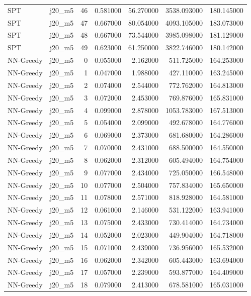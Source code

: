 \begin{tabular}{llrrrrr}
SPT & j20_m5 & 46 & 0.581000 & 56.270000 & 3538.093000 & 180.145000 \\
SPT & j20_m5 & 47 & 0.667000 & 80.054000 & 4093.105000 & 183.073000 \\
SPT & j20_m5 & 48 & 0.667000 & 73.544000 & 3985.098000 & 181.129000 \\
SPT & j20_m5 & 49 & 0.623000 & 61.250000 & 3822.746000 & 180.142000 \\
NN-Greedy & j20_m5 & 0 & 0.055000 & 2.162000 & 511.725000 & 164.253000 \\
NN-Greedy & j20_m5 & 1 & 0.047000 & 1.988000 & 427.110000 & 163.245000 \\
NN-Greedy & j20_m5 & 2 & 0.074000 & 2.544000 & 772.762000 & 164.813000 \\
NN-Greedy & j20_m5 & 3 & 0.072000 & 2.453000 & 769.876000 & 165.831000 \\
NN-Greedy & j20_m5 & 4 & 0.099000 & 2.878000 & 1053.783000 & 167.513000 \\
NN-Greedy & j20_m5 & 5 & 0.054000 & 2.099000 & 492.678000 & 164.776000 \\
NN-Greedy & j20_m5 & 6 & 0.069000 & 2.373000 & 681.680000 & 164.286000 \\
NN-Greedy & j20_m5 & 7 & 0.070000 & 2.431000 & 688.500000 & 164.550000 \\
NN-Greedy & j20_m5 & 8 & 0.062000 & 2.312000 & 605.494000 & 164.754000 \\
NN-Greedy & j20_m5 & 9 & 0.077000 & 2.434000 & 725.050000 & 166.548000 \\
NN-Greedy & j20_m5 & 10 & 0.077000 & 2.504000 & 757.834000 & 165.650000 \\
NN-Greedy & j20_m5 & 11 & 0.078000 & 2.571000 & 818.928000 & 164.581000 \\
NN-Greedy & j20_m5 & 12 & 0.061000 & 2.146000 & 531.122000 & 163.941000 \\
NN-Greedy & j20_m5 & 13 & 0.075000 & 2.433000 & 730.414000 & 164.734000 \\
NN-Greedy & j20_m5 & 14 & 0.052000 & 2.023000 & 449.904000 & 164.718000 \\
NN-Greedy & j20_m5 & 15 & 0.071000 & 2.439000 & 736.956000 & 165.532000 \\
NN-Greedy & j20_m5 & 16 & 0.062000 & 2.342000 & 605.443000 & 163.694000 \\
NN-Greedy & j20_m5 & 17 & 0.057000 & 2.239000 & 593.877000 & 164.409000 \\
NN-Greedy & j20_m5 & 18 & 0.079000 & 2.413000 & 678.581000 & 165.031000 \\

\end{tabular}
